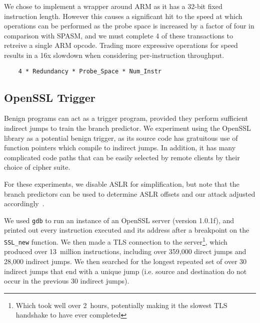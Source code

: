
We chose to implement a wrapper around ARM as it has a 32-bit fixed instruction
length. However this causes a significant hit to the speed at which operations 
can be performed as the probe space is increased by a factor of four in 
comparison with SPASM,  and we must complete 4 of these transactions to 
retreive a single ARM opcode. Trading more expressive operations for speed
results in a 16x slowdown when considering per-instruction throughput. 

\begin{lstlisting}
    4 * Redundancy * Probe_Space * Num_Instr
\end{lstlisting}

\subsection{OpenSSL Trigger}
\label{subsec:openssl}

Benign programs can act as a trigger program, provided they perform sufficient
indirect jumps to train the branch predictor. We experiment using the OpenSSL
library as a potential benign trigger, as its source code has gratuitous use of
function pointers which compile to indirect jumps. In addition, it has many
complicated code paths that can be easily selected by remote clients by their
choice of cipher suite.

For these experiments, we disable ASLR for simplification, but note that the
branch predictors can be used to determine ASLR offsets and our attack adjusted
accordingly~\cite{evtyushkin2016jump}.

We used \texttt{gdb} to run an instance of an OpenSSL server (version 1.0.1f),
and printed out every instruction executed and its address after a breakpoint on
the \texttt{SSL\_new} function. We then made a TLS connection to the
server\footnote{Which took well over 2~hours, potentially making it the slowest
TLS handshake to have ever completed},
which produced over 13~million instructions, including over 359,000 direct jumps
and 28,000 indirect jumps. We then searched for the longest repeated set of over
30 indirect jumps that end with a unique jump (i.e. source and destination do
not occur in the previous 30 indirect jumps).

